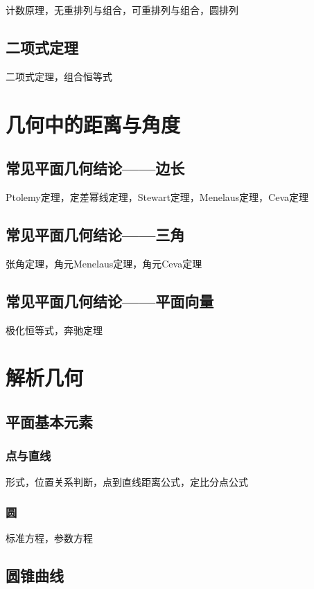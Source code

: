 \documentclass[lang=cn, zihao=4.5]{elegantbook}
\begin{document}
计数原理，无重排列与组合，可重排列与组合，圆排列

\section{二项式定理}

二项式定理，组合恒等式

\chapter{几何中的距离与角度}

\section{常见平面几何结论——边长}

Ptolemy定理，定差幂线定理，Stewart定理，Menelaus定理，Ceva定理

\section{常见平面几何结论——三角}

张角定理，角元Menelaus定理，角元Ceva定理

\section{常见平面几何结论——平面向量}

极化恒等式，奔驰定理

\chapter{解析几何}

\section{平面基本元素}

\subsection{点与直线}

形式，位置关系判断，点到直线距离公式，定比分点公式

\subsection{圆}

标准方程，参数方程

\section{圆锥曲线}
\end{document}
